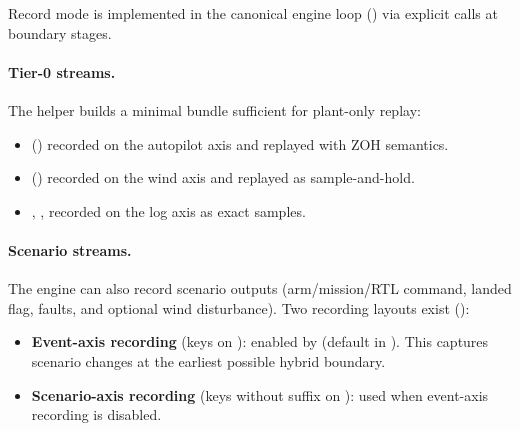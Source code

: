 Record mode is implemented in the canonical engine loop () via explicit  calls at boundary stages.

\paragraph{Tier-0 streams.}
The helper  builds a minimal bundle sufficient for plant-only replay:
\begin{itemize}[leftmargin=*,itemsep=2pt]
  \item {} () recorded on the autopilot axis and replayed with ZOH semantics.
  \item {} () recorded on the wind axis and replayed as sample-and-hold.
  \item {}, ,  recorded on the log axis as exact samples.
\end{itemize}

\paragraph{Scenario streams.}
The engine can also record scenario outputs (arm/mission/RTL command, landed flag, faults, and optional wind disturbance). Two recording layouts exist ():
\begin{itemize}[leftmargin=*,itemsep=2pt]
  \item \textbf{Event-axis recording} (keys  on ): enabled by  (default in ). This captures scenario changes at the earliest possible hybrid boundary.
  \item \textbf{Scenario-axis recording} (keys without suffix on ): used when event-axis recording is disabled.
\end{itemize}

